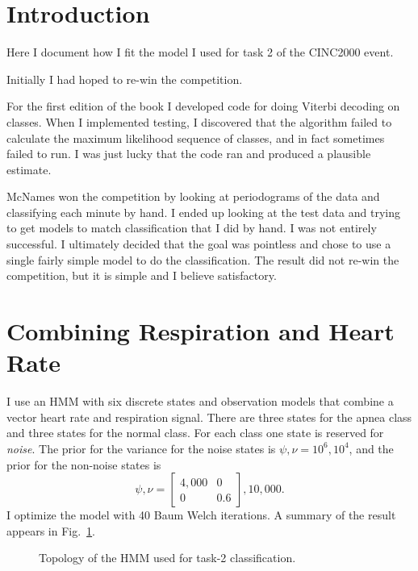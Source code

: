 \documentclass[12pt]{article}
\begin{document}
\section{Introduction}
\label{sec:introduction}

Here I document how I fit the model I used for task 2 of the CINC2000
event.

Initially I had hoped to re-win the competition.

For the first edition of the book I developed code for doing Viterbi
decoding on classes.  When I implemented testing, I discovered that
the algorithm failed to calculate the maximum likelihood sequence of
classes, and in fact sometimes failed to run.  I was just lucky that
the code ran and produced a plausible estimate.

McNames won the competition by looking at periodograms of the
data and classifying each minute by hand.  I ended up looking at the
test data and trying to get models to match classification that I did by
hand.  I was not entirely successful.  I ultimately decided that the
goal was pointless and chose to use a single fairly simple model to do
the classification.  The result did not re-win the competition, but it
is simple and I believe satisfactory.

\section{Combining Respiration and Heart Rate}
\label{sec:combination}

I use an HMM with six discrete states and observation models that
combine a vector heart rate and respiration signal.  There are three
states for the apnea class and three states for the normal class.  For
each class one state is reserved for \emph{noise}.  The prior for the
variance for the noise states is $\psi, \nu = 10^6, 10^4$, and the
prior for the non-noise states is
\begin{equation*}
  \psi, \nu =
  \begin{bmatrix}
    4,000 & 0 \\ 0 & 0.6 
  \end{bmatrix}, 10,000. 
\end{equation*}
I optimize the model with 40 Baum Welch iterations.  A summary of the
result appears in Fig.~\ref{fig:viz}.

\begin{figure}
  \centering
  \caption{Topology of the HMM used for task-2 classification.}
  \label{fig:viz}
\end{figure}
\end{document}
